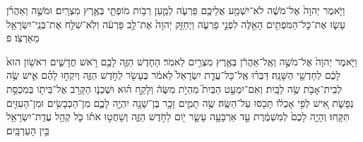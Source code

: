 \documentclass{openreader}
\begin{document}
וַיֹּ֤אמֶר יְהוָה֙ אֶל־מֹשֶׁ֔ה לֹא־יִשְׁמַ֥ע אֲלֵיכֶ֖ם פַּרְעֹ֑ה לְמַ֛עַן רְבֹ֥ות מֹופְתַ֖י בְּאֶ֥רֶץ מִצְרָֽיִם׃ 
וּמֹשֶׁ֣ה וְאַהֲרֹ֗ן עָשׂ֛וּ אֶת־כָּל־הַמֹּפְתִ֥ים הָאֵ֖לֶּה לִפְנֵ֣י פַרְעֹ֑ה וַיְחַזֵּ֤ק יְהוָה֙ אֶת־לֵ֣ב פַּרְעֹ֔ה וְלֹֽא־שִׁלַּ֥ח אֶת־בְּנֵֽי־יִשְׂרָאֵ֖ל מֵאַרְצֹֽו׃ פ 

וַיֹּ֤אמֶר יְהוָה֙ אֶל־מֹשֶׁ֣ה וְאֶֽל־אַהֲרֹ֔ן בְּאֶ֥רֶץ מִצְרַ֖יִם לֵאמֹֽר׃ 
הַחֹ֧דֶשׁ הַזֶּ֛ה לָכֶ֖ם רֹ֣אשׁ חֳדָשִׁ֑ים רִאשֹׁ֥ון הוּא֙ לָכֶ֔ם לְחָדְשֵׁ֖י הַשָּׁנָֽה׃ 
דַּבְּר֗וּ אֶֽל־כָּל־עֲדַ֤ת יִשְׂרָאֵל֙ לֵאמֹ֔ר בֶּעָשֹׂ֖ר לַחֹ֣דֶשׁ הַזֶּ֑ה וְיִקְח֣וּ לָהֶ֗ם אִ֛ישׁ שֶׂ֥ה לְבֵית־אָבֹ֖ת שֶׂ֥ה לַבָּֽיִת׃ 
וְאִם־יִמְעַ֣ט הַבַּיִת֮ מִהְיֹ֣ת מִשֶּׂה֒ וְלָקַ֣ח ה֗וּא וּשְׁכֵנֹ֛ו הַקָּרֹ֥ב אֶל־בֵּיתֹ֖ו בְּמִכְסַ֣ת נְפָשֹׁ֑ת אִ֚ישׁ לְפִ֣י אָכְלֹ֔ו תָּכֹ֖סּוּ עַל־הַשֶּֽׂה׃ 
שֶׂ֥ה תָמִ֛ים זָכָ֥ר בֶּן־שָׁנָ֖ה יִהְיֶ֣ה לָכֶ֑ם מִן־הַכְּבָשִׂ֥ים וּמִן־הָעִזִּ֖ים תִּקָּֽחוּ׃ 
וְהָיָ֤ה לָכֶם֙ לְמִשְׁמֶ֔רֶת עַ֣ד אַרְבָּעָ֥ה עָשָׂ֛ר יֹ֖ום לַחֹ֣דֶשׁ הַזֶּ֑ה וְשָׁחֲט֣וּ אֹתֹ֗ו כֹּ֛ל קְהַ֥ל עֲדַֽת־יִשְׂרָאֵ֖ל בֵּ֥ין הָעַרְבָּֽיִם׃ 
\end{document}

